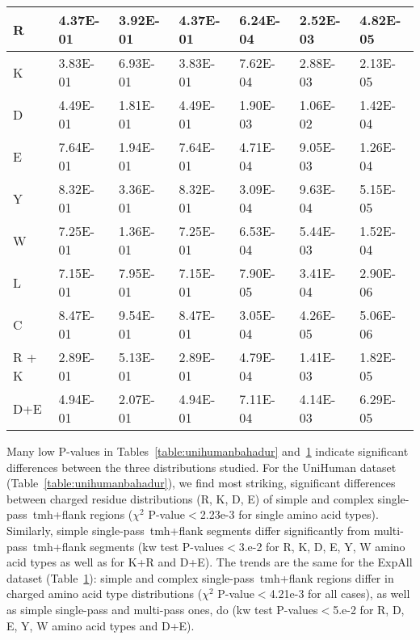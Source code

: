 \begin{table}[htbp]
{\begin{tabular}{ p{5em} l l l l l l }
    \midrule
     R    & 4.37E-01 & 3.92E-01 & 4.37E-01 & 6.24E-04 & 2.52E-03 & 4.82E-05 \\
    \midrule
     K    & 3.83E-01 & 6.93E-01 & 3.83E-01 & 7.62E-04 & 2.88E-03 & 2.13E-05 \\
    \midrule
     D    & 4.49E-01 & 1.81E-01 & 4.49E-01 & 1.90E-03 & 1.06E-02 & 1.42E-04 \\
    \midrule
     E    & 7.64E-01 & 1.94E-01 & 7.64E-01 & 4.71E-04 & 9.05E-03 & 1.26E-04 \\
    \midrule
     Y    & 8.32E-01 & 3.36E-01 & 8.32E-01 & 3.09E-04 & 9.63E-04 & 5.15E-05 \\
    \midrule
     W    & 7.25E-01 & 1.36E-01 & 7.25E-01 & 6.53E-04 & 5.44E-03 & 1.52E-04 \\
    \midrule
     L    & 7.15E-01 & 7.95E-01 & 7.15E-01 & 7.90E-05 & 3.41E-04 & 2.90E-06 \\
    \midrule
     C    & 8.47E-01 & 9.54E-01 & 8.47E-01 & 3.05E-04 & 4.26E-05 & 5.06E-06 \\
    \midrule
     R + K & 2.89E-01 & 5.13E-01 & 2.89E-01 & 4.79E-04 & 1.41E-03 & 1.82E-05 \\
    \midrule
     D+E & 4.94E-01 & 2.07E-01 & 4.94E-01 & 7.11E-04 & 4.14E-03 & 6.29E-05 \\
    \bottomrule
    \end{tabular}%
    }%
   \label{table:expallbahadur}

\end{table}%

Many low P\--values in Tables~\ref{table:unihumanbahadur} and~\ref{table:expallbahadur} indicate significant differences between the three distributions studied.
For the UniHuman dataset (Table~\ref{table:unihumanbahadur}), we find most striking, significant differences between charged residue distributions (R, K, D, E) of simple and complex single-pass~\gls{tmh}+flank regions (\({\chi}^{2}\) P\--value$<$2.23e-3 for single amino acid types).
Similarly, simple single-pass~\gls{tmh}+flank segments differ significantly from multi-pass~\gls{tmh}+flank segments (\gls{kw} test P\--values$<$3.e-2 for R, K, D, E, Y, W amino acid types as well as for K+R and D+E).
The trends are the same for the ExpAll dataset (Table~\ref{table:expallbahadur}): simple and complex single-pass~\gls{tmh}+flank regions differ in charged amino acid type distributions (\({\chi}^{2}\) P\--value$<$4.21e-3 for all cases), as well as simple single-pass and multi-pass ones, do (\gls{kw} test P\--values$<$5.e-2 for R, D, E, Y, W amino acid types and D+E).

